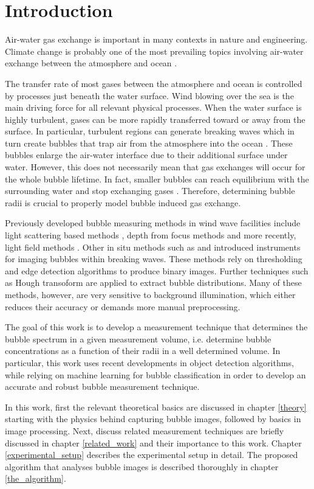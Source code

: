 \chapter{Introduction}
	Air-water gas exchange is important in many contexts in nature and engineering. Climate change is probably one of the most prevailing topics involving air-water exchange between the atmosphere and ocean \citep{NIWA}.
	
	The transfer rate of most gases between the atmosphere and ocean is controlled by processes just beneath the water surface. Wind blowing over the sea is the main driving force for all relevant physical processes. 
	When the water surface is highly turbulent, gases can be more rapidly transferred toward or away from the surface. In particular, turbulent regions can generate breaking waves which in turn create bubbles that trap air from the atmosphere into the ocean \citep{Terry}. These bubbles enlarge the air-water interface due to their additional surface under water. However, this does not necessarily mean that gas exchanges will occur for the whole bubble lifetime. In fact, smaller bubbles can reach equilibrium with the surrounding water and stop exchanging gases \citep{MischlerDiss}. Therefore, determining bubble radii is crucial to properly model bubble induced gas exchange.
	
	Previously developed bubble measuring methods in wind wave facilities include light scattering based methods \citep{jaehne1984}, depth from focus methods \citep{geissler_1995} and more recently, light field methods \citep{MischlerDiss}. Other in situ methods such as \citet{Al-Lashi2016} and \citet{Leifer2003} introduced instruments for imaging bubbles within breaking waves. These methods rely on thresholding and edge detection algorithms to produce binary images. Further techniques such as Hough transoform \citep{Hough1972} are applied to extract bubble distributions. Many of these methods, however, are very sensitive to background illumination, which either reduces their accuracy \citep{Zhong2016} or demands more manual preprocessing.  
	
	The goal of this work is to develop a measurement technique that determines the bubble spectrum in a given measurement volume, i.e. determine bubble concentrations as a function of their radii in a well determined volume. In particular, this work uses recent developments in object detection algorithms, while relying on machine learning for bubble classification in order to develop an accurate and robust bubble measurement technique. 
	
	In this work, first the relevant theoretical basics are discussed in chapter \ref{theory} starting with the physics behind capturing bubble images, followed by basics in image processing. Next, discuss related measurement techniques are briefly discussed in chapter \ref{related_work} and their importance to this work. Chapter \ref{experimental_setup} describes the experimental setup in detail. The proposed algorithm that analyses bubble images is described thoroughly in chapter \ref{the_algorithm}. 